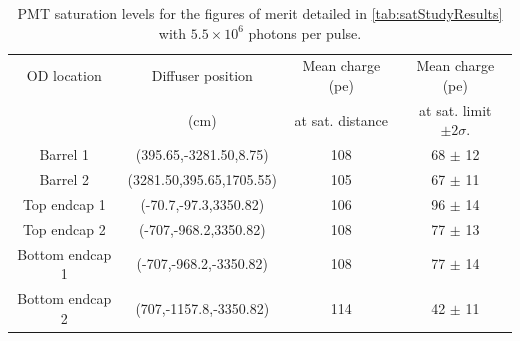\documentclass[a4paper,11pt]{article}
\begin{document}
\begin{table}[ht!]
    \centering
    \begin{tabular}{|c|c|c|c|}
    \hline
        OD location &Diffuser position & Mean charge (pe)   & Mean charge (pe)    \\
                    &  (cm)                & at sat. distance & at sat. limit $\pm2\sigma$.  \\
        \hline
        Barrel 1       & (395.65,-3281.50,8.75)   & 108  & 68 $\pm$ 12 \\ 
        Barrel 2       & (3281.50,395.65,1705.55) & 105  & 67 $\pm$ 11 \\ 
        Top endcap 1   & (-70.7,-97.3,3350.82)    & 106  & 96 $\pm$ 14 \\
        Top endcap 2   & (-707,-968.2,3350.82)    & 108  & 77 $\pm$ 13 \\
        Bottom endcap 1 & (-707,-968.2,-3350.82)  & 108  & 77 $\pm$ 14 \\ 
        Bottom endcap 2 & (707,-1157.8,-3350.82)  & 114  & 42 $\pm$ 11 \\ 
        \hline
    \end{tabular}
    \caption{PMT saturation levels for the figures of merit detailed in \cref{tab:satStudyResults} with $5.5\times10^6$ photons per pulse.}
    \label{tab:satStudyResults_pevalues}
\end{table}
\end{document}
